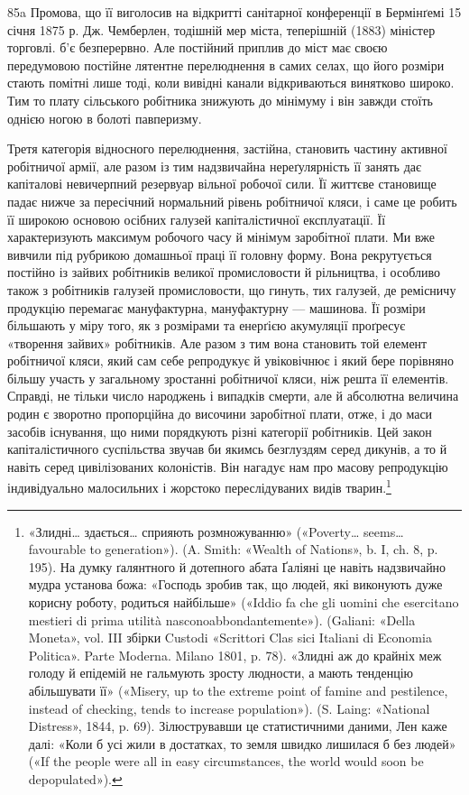 85a Промова, що її виголосив на відкритті санітарної конференції в Бермінґемі 15 січня 1875 р. Дж.
Чемберлен, тодішній мер міста, теперішній (1883) міністер торговлі.
б’є безперервно. Але постійний приплив до міст має своєю передумовою постійне лятентне перелюднення
в самих селах, що його розміри стають помітні лише тоді, коли вивідні канали відкриваються винятково
широко. Тим то плату сільського робітника
знижують до мінімуму і він завжди стоїть однією ногою в болоті павперизму.

Третя категорія відносного перелюднення, застійна, становить частину активної робітничої армії, але
разом із тим надзвичайна нереґулярність її занять дає капіталові невичерпний резервуар вільної
робочої сили. Її життєве становище падає нижче за
пересічний нормальний рівень робітничої кляси, і саме це робить її широкою основою осібних галузей
капіталістичної експлуатації. Її характеризують максимум робочого часу й мінімум заробітної плати.
Ми вже вивчили під рубрикою домашньої праці її головну форму. Вона рекрутується постійно із зайвих
робітників великої промисловости й рільництва, і особливо також з робітників галузей промисловости,
що гинуть, тих галузей, де ремісничу продукцію перемагає мануфактурна, мануфактурну — машинова. Її
розміри більшають у міру того, як з розмірами та енерґією акумуляції проґресує «творення зайвих»
робітників. Але разом з тим вона становить той елемент робітничої кляси, який сам себе репродукує й
увіковічнює і який бере порівняно більшу участь у загальному зростанні робітничої кляси, ніж решта
її елементів. Справді, не тільки число народжень і випадків смерти, але й абсолютна величина родин є
зворотно пропорційна до височини заробітної плати, отже, і до маси засобів існування, що ними
порядкують різні категорії робітників. Цей закон капіталістичного суспільства звучав би якимсь
безглуздям серед дикунів, а то й навіть серед цивілізованих колоністів. Він нагадує нам про масову
репродукцію індивідуально малосильних і жорстоко переслідуваних видів тварин.\footnote{
«Злидні\dots{} здається\dots{} сприяють розмножуванню» («Poverty\dots{} seems\dots{} favourable to generation»).
(A. Smith: «Wealth of Nations», b. I, ch. 8, p. 195). На думку ґалянтного й дотепного абата Ґаліяні
це навіть надзвичайно мудра установа божа: «Господь зробив так, що людей, які виконують дуже корисну
роботу, родиться найбільше» («Iddio fa che
gli uomini che esercitano mestieri di prima utilità nasconoabbondantemente»). (Galiani: «Della
Moneta», vol. III збірки Custodi «Scrittori Clas sici Italiani di Economia Politica». Parte Moderna.
Milano 1801, p. 78). «Злидні аж до крайніх меж голоду й епідемій не гальмують зросту людности, а
мають тенденцію абільшувати її» («Misery, up to the extreme point of famine and pestilence, instead
of checking, tends to increase population»).
(S. Laing: «National Distress», 1844, p. 69). Зілюструвавши це статистичними даними, Лен каже далі:
«Коли б усі жили в достатках, то земля швидко лишилася б без людей» («If the people were all in easy
circumstances, the world would soon be depopulated»).
}

